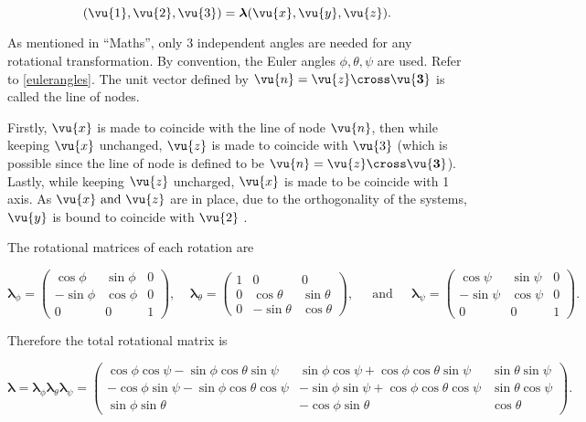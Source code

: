 \documentclass[a4paper,12pt]{report}
\begin{document}
\begin{equation}
	(\vu{1} ,\vu{2} , \vu{3 }) = \boldsymbol{\lambda } (\vu{x} ,\vu{y} ,\vu{z} ). 
\end{equation}

As mentioned in ``Maths'', only 3 independent angles are needed for any rotational transformation. By convention, the Euler angles \(\phi,\theta,\psi \) are used. Refer to \cref{eulerangles}. The unit vector defined by \(\vu{n} = \vu{z} \cross \vu{\boldsymbol{3}  } \) is called the line of nodes. 

Firstly, \(\vu{x} \) is made to coincide with the line of node \(\vu{n} \), then while keeping \(\vu{x} \) unchanged, \(\vu{z} \) is made to coincide with \(\vu{3} \)  (which is possible since the line of node is defined to be \(\vu{n} = \vu{z} \cross \vu{\boldsymbol{3}  }\)). Lastly, while keeping \(\vu{z} \) uncharged, \(\vu{x} \) is made to be coincide with 1 axis. As \(\vu{x} \text{ and } \vu{z} \) are in place, due to the orthogonality of the systems, \(\vu{y} \) is bound to coincide with \(\vu{2} \) .        

The rotational matrices of each rotation are

\begin{equation}
	\boldsymbol{\lambda } _{\phi } = \begin{pmatrix}
	\cos \phi  & \sin \phi  & 0\\
	-\sin \phi  & \cos \phi  & 0\\
	0 & 0 & 1
	\end{pmatrix}
	,~~~~~\boldsymbol{\lambda } _{\theta } = \begin{pmatrix}
	1 & 0 & 0\\
	0 & \cos \theta  & \sin \theta \\
	0 & -\sin \theta  & \cos \theta 
	\end{pmatrix}
	,~~~~~ \text{ and }~~~~~ \boldsymbol{\lambda } _{\psi } = \begin{pmatrix}
	\cos \psi  & \sin \psi  & 0\\
	-\sin \psi  & \cos \psi  & 0\\
	0 & 0 & 1
	\end{pmatrix}
	. 
\end{equation}

Therefore the total rotational matrix is

\begin{equation}
	\boldsymbol{\lambda } = \boldsymbol{\lambda } _{\phi } \boldsymbol{\lambda } _{\theta } \boldsymbol{\lambda } _{\psi } = \begin{pmatrix}
	\cos \phi \cos \psi - \sin \phi \cos \theta \sin \psi  & \sin \phi \cos \psi  + \cos \phi \cos \theta \sin \psi  & \sin \theta \sin \psi \\
	-\cos \phi \sin \psi -\sin \phi \cos \theta \cos \psi  & -\sin \phi \sin \psi  + \cos \phi \cos \theta \cos \psi  & \sin \theta \cos \psi \\
	\sin \phi \sin \theta  & -\cos \phi \sin \theta  & \cos \theta 
	\end{pmatrix}
	.
\end{equation}
\end{document}
